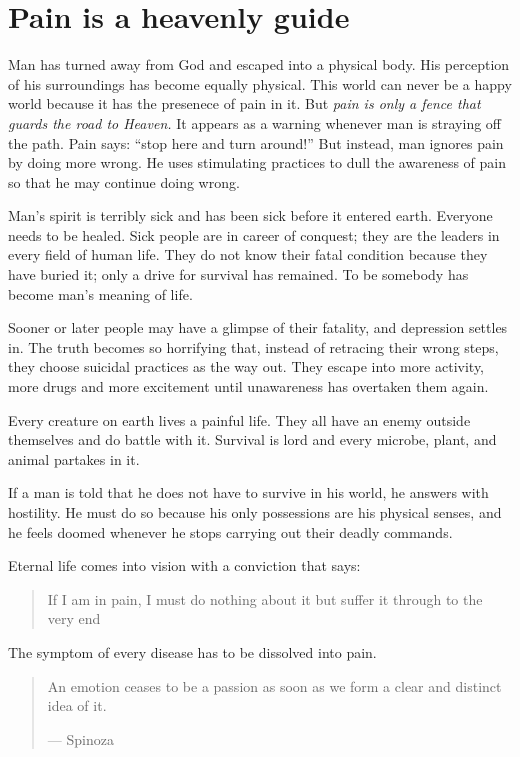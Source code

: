 \documentclass[landscape,twocolumn,letterpaper]{article}
\begin{document}
\section{Pain is a heavenly guide}

Man has turned away from God and escaped into a physical body. His
perception of his surroundings has become equally physical. This world
can never be a happy world because it has the presenece of pain in
it. But \emph{pain is only a fence that guards the road to Heaven.} It
appears as a warning whenever man is straying off the path. Pain says:
``stop here and turn around!'' But instead, man ignores pain by doing
more wrong. He uses stimulating practices to dull the awareness of
pain so that he may continue doing wrong.

Man's spirit is terribly sick and has been sick before it entered
earth. Everyone needs to be healed. Sick people are in career of
conquest; they are the leaders in every field of human life. They do
not know their fatal condition because they have buried it; only a
drive for survival has remained. To be somebody has become man's
meaning of life.

Sooner or later people may have a glimpse of their fatality, and
depression settles in. The truth becomes so horrifying that, instead
of retracing their wrong steps, they choose suicidal practices as the
way out. They escape into more activity, more drugs and more
excitement until unawareness has overtaken them again.

Every creature on earth lives a painful life. They all have an enemy
outside themselves and do battle with it. Survival is lord and every
microbe, plant, and animal partakes in it.

If a man is told that he does not have to survive in his world, he
answers with hostility. He must do so because his only possessions are
his physical senses, and he feels doomed whenever he stops carrying
out their deadly commands.

Eternal life comes into vision with a conviction that says:
\begin{quote} If I am in pain, I must do nothing about it but suffer
it through to the very end
\end{quote} The symptom of every disease has to be dissolved into
pain.

\begin{quote} An emotion ceases to be a passion as soon as we form a
clear and distinct idea of it.

--- Spinoza
\end{quote}
\end{document}

